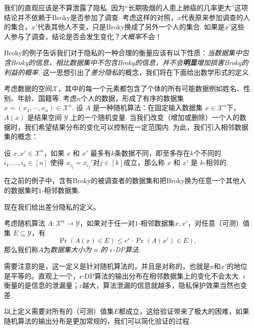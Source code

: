 我们的直观应该是不算泄露了隐私. 因为“长期吸烟的人患上肺癌的几率更大”这项结论并不依赖于Broky是否参加了调查. 考虑这样的对照，$x$代表原来参加调查的人的集合，$x'$代表其他人不变，只是Broky换成了另外一个人的集合. 如果是$x'$这些人参与了调查，结论是否会发生变化？\emph{大概率}不会！

Broky的例子告诉我们对于隐私的一种合理的衡量应该有以下性质：\emph{当数据集中包含Broky的信息，相比数据集中不包含Broky的信息，并不会\textbf{明显}增加损害Broky的利益的概率.} 这一思想引出了\emph{差分隐私}的概念，我们将在下面给出数学形式的定义.

考虑数据的空间$\mathcal X$，其中的每一个元素都包含了个体的所有可能数据例如姓名、性别、年龄、国籍等. 考虑$n$个人的数据，形成了有序的数据集$x = (x_1, \cdots, x_n) \in \mathcal X^n$.  设 $A$ 是一种随机算法：在固定输入数据集 $x \in \mathcal X^n$下，$A(x)$ 是结果空间 $\mathcal Y$ 上的一个随机变量. 当我们改变（增加或删除）一个人的数据时，我们希望结果分布的变化可以控制在一定范围内. 为此，我们引入相邻数据集的概念：

\begin{definition}[$k$-相邻数据集]
    设 $x, x' \in \mathcal X^n$，如果 $x$ 和 $x'$ 最多有$k$条数据不同，即至多存在$k$个不同的$i_1,\dots,i_k \in [n]$ 使得 $x_{i_j}=x_{i_j}'$对$j\in[k]$成立，那么称 $x$ 和 $x'$ 是 $k$-相邻的.
\end{definition}

在之前的例子中，含有Broky的被调查者的数据集和把Broky换为任意一个其他人的数据集时$1$-相邻数据集.

现在我们给出差分隐私的定义。

\begin{definition}[$\epsilon$-DP]
考虑随机算法 $A : \mathcal X^n \to \mathcal Y$，如果对于任一对$1$-相邻数据集$x, x'$，对任意（可测）值集 $E \subseteq \mathcal Y$，有
\[
\Pr(A(x)\in E) \leq e^{\epsilon} \cdot \Pr(A(x')\in E),
\]
那么我们称$A$为\emph{数据集大小为 $n$ 的 $\epsilon$-DP算法}.
\end{definition}

需要注意的是，这一定义是针对随机算法的，并且是对称的，也就是$x$和$x'$的地位是平等的。直观上一个，$\epsilon$-DP算法的输出分布在相邻数据集上的变化不会太大. $\epsilon$衡量的是信息的泄漏量；$\epsilon$越大，算法泄漏的信息就越多，隐私保护效果当然也变差.

以上定义需要对所有的（可测）值集$E$都成立，这给验证带来了极大的困难，如果随机算法的输出分布是更加常规的，我们可以简化验证的过程. 

